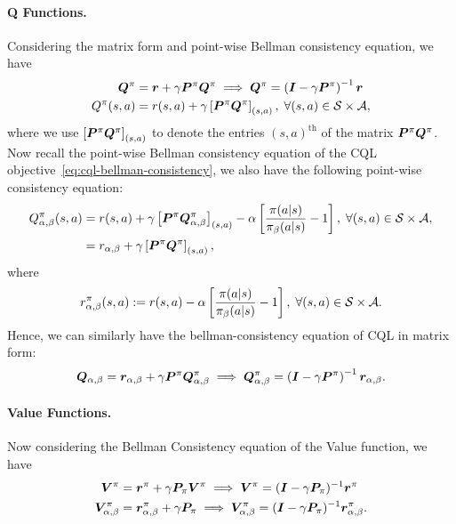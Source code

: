 \paragraph{Q Functions.}
Considering the matrix form and point-wise Bellman consistency equation, we have
\begin{align}
    \boldsymbol Q^\pi &= \boldsymbol r + \gamma \boldsymbol P^\pi \boldsymbol Q^\pi\implies \boldsymbol Q^\pi = \left( \boldsymbol I - \gamma \boldsymbol P^\pi \right)^{-1}\boldsymbol r\\
    Q^\pi(s,a) &= r(s,a) + \gamma \left[ \boldsymbol P^\pi \boldsymbol Q^\pi \right]_{(s,a)},\;\forall (s,a)\in \mathcal S\times \mathcal A,
\end{align}
where we use $\left[ \boldsymbol P^\pi \boldsymbol Q^\pi \right]_{(s,a)}$ to denote the entries $(s,a)^\text{th}$ of the matrix $\boldsymbol P^\pi \boldsymbol Q^\pi$.
Now recall the point-wise Bellman consistency equation of the CQL objective~\eqref{eq:cql-bellman-consistency}, we also have the following point-wise consistency equation:
\begin{align}
    Q_{\alpha,\beta}^\pi(s,a) &= r(s,a) + \gamma \left[ \boldsymbol P^\pi \boldsymbol Q_{\alpha,\beta}^\pi \right]_{(s,a)} - \alpha\left[ \frac{\pi(a|s)}{\pi_\beta(a|s)}-1 \right],\;\forall (s,a)\in \mathcal S\times \mathcal A,\\
    &= r_{\alpha,\beta} + \gamma \left[ \boldsymbol P^\pi \boldsymbol Q^\pi \right]_{(s,a)},
\end{align}
where 
\begin{equation}
    \label{eq:new-bellman-reward-cql}
    r^\pi_{\alpha,\beta}(s,a) := r(s,a) - \alpha\left[ \frac{\pi(a|s)}{\pi_\beta(a|s)}-1 \right],\;\forall (s,a)\in \mathcal S\times \mathcal A.
\end{equation}
Hence, we can similarly have the bellman-consistency equation of CQL in matrix form:
\begin{equation}
    \boldsymbol Q_{\alpha,\beta} = \boldsymbol r_{\alpha,\beta} + \gamma \boldsymbol P^\pi \boldsymbol Q^\pi_{\alpha,\beta} \implies \boldsymbol Q^\pi_{\alpha,\beta}=\left( \boldsymbol I - \gamma \boldsymbol P^\pi \right)^{-1}\boldsymbol r_{\alpha,\beta}.
\end{equation}
\paragraph{Value Functions.} Now considering the Bellman Consistency equation of the Value function, we have
\begin{align}
    \boldsymbol V^\pi &= \boldsymbol r^\pi + \gamma \boldsymbol P_\pi \boldsymbol V^\pi\implies\boldsymbol V^\pi = (\boldsymbol I - \gamma \boldsymbol P_\pi)^{-1}\boldsymbol r^\pi\\
    \boldsymbol V_{\alpha,\beta}^{\pi} &= \boldsymbol r^\pi_{\alpha,\beta} + \gamma \boldsymbol P_\pi \implies \boldsymbol V_{\alpha,\beta}^\pi = (\boldsymbol I - \gamma \boldsymbol P_\pi)^{-1}\boldsymbol r_{\alpha,\beta}^\pi.
\end{align}


